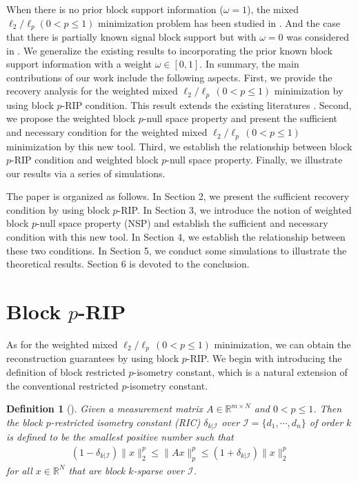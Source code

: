 \documentclass[11pt]{article}
\newtheorem{definition}{Definition}
\begin{document}
When there is no prior block support information ($\omega=1$), the mixed $\ell_2/\ell_p (0<p\leq 1)$ minimization problem has been studied in \cite{wwx1,wwx2}. And the case that there is partially known signal block support but with $\omega=0$ was considered in \cite{hwwx}. We generalize the existing results to incorporating the prior known block support information with a weight $\omega\in[0,1]$. In summary, the main contributions of our work include the following aspects. First, we provide the recovery analysis for the weighted mixed $\ell_2/\ell_p\,(0<p\leq 1)$ minimization by using block $p$-RIP condition. This result extends the existing literatures \cite{fmsy,hwwx,vl,wwx1,wwx2}. Second, we propose the weighted block $p$-null space property and present the sufficient and necessary condition for the weighted mixed $\ell_2/\ell_p\,(0<p\leq 1)$ minimization by this new tool.
Third, we establish the relationship between block $p$-RIP condition and weighted block $p$-null space property. Finally, we illustrate our results via a series of simulations.

The paper is organized as follows. In Section 2, we present the sufficient recovery condition by using block $p$-RIP. In Section 3, we introduce the notion of weighted block $p$-null space property (NSP) and establish the sufficient and necessary condition with this new tool. In Section 4, we establish the relationship between these two conditions. In Section 5, we conduct some simulations to illustrate the theoretical results. Section 6 is devoted to the conclusion.

\section{Block $p$-RIP}
As for the weighted mixed $\ell_2/\ell_p\,(0<p\leq 1)$ minimization, we can obtain the reconstruction guarantees by using block $p$-RIP. We begin with introducing the definition of block restricted $p$-isometry constant, which is a natural extension of the conventional restricted $p$-isometry constant.\\

\begin{definition}[\cite{cs,hwwx,wwx1,wwx2}] Given a measurement matrix $A\in\mathbb{R}^{m\times N}$ and $0<p\leq 1$. Then the block $p$-restricted isometry constant (RIC) $\delta_{k|\mathcal{I}}$ over
$\mathcal{I}=\{d_1,\cdots,d_n\}$ of order $k$ is defined to be the smallest positive number such that
\begin{align}
(1-\delta_{k|\mathcal{I}})\lVert x\rVert_2^p\leq\lVert Ax\rVert_p^p\leq (1+\delta_{k|\mathcal{I}})\lVert x\rVert_2^p
\end{align}
for all $x\in\mathbb{R}^N$ that are block $k$-sparse over $\mathcal{I}$.
\end{definition}
\end{document}
